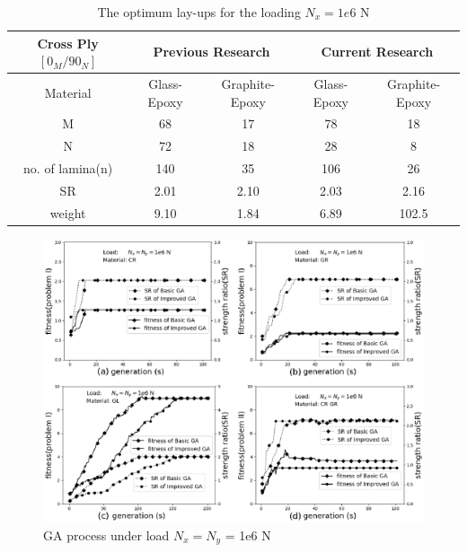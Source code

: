 \documentclass[Afour,sagev,times]{sagej}
\begin{document}
\begin{table}[!htb]
\caption{The optimum lay-ups for the loading $N_x=1e6$ N}
\centering
\begin{adjustbox}{width=1\textwidth}
\begin{tabular}{c|cc|cc}
	\toprule
	Cross Ply $[0_M/90_N]$         & \multicolumn{2}{c}{Previous Research} & \multicolumn{2}{c}{Current Research} \\
	\midrule																								  
	 Material       &  Glass-Epoxy & Graphite-Epoxy  & Glass-Epoxy & Graphite-Epoxy      \\ 
	      M         &  68          &    17           &  78		    &  18             \\
	      N         &  72          &    18           &  28		    &  8              \\
no. of lamina(n)    &  140         &    35           &  106	    &  26                     \\
         SR         &  2.01        &    2.10         &  2.03	    &  2.16            \\
     weight         &  9.10        &    1.84         &  6.89	    &  102.5           \\
	\bottomrule
\end{tabular}
\end{adjustbox}
\label{tab:comparsion}
\end{table}


\begin{figure}[!htb]
  \includegraphics[width=\linewidth]{NxNy}
  \caption{GA process under load  $N_x=N_y$ = 1e6 N}
  \label{fig:NxNy}
\end{figure}
\end{document}
